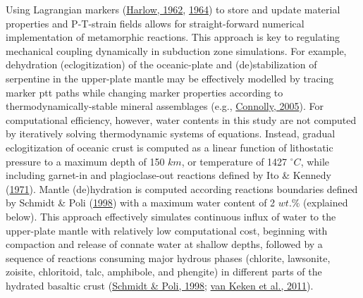 Using Lagrangian markers (\protect\hyperlink{ref-harlow1962}{Harlow, 1962}, \protect\hyperlink{ref-harlow1964}{1964}) to store and update material properties and P-T-strain fields allows for straight-forward numerical implementation of metamorphic reactions. This approach is key to regulating mechanical coupling dynamically in subduction zone simulations. For example, dehydration (eclogitization) of the oceanic-plate and (de)stabilization of serpentine in the upper-plate mantle may be effectively modelled by tracing marker \gls{ptt} paths while changing marker properties according to thermodynamically-stable mineral assemblages (e.g., \protect\hyperlink{ref-connolly2005}{Connolly, 2005}). For computational efficiency, however, water contents in this study are not computed by iteratively solving thermodynamic systems of equations. Instead, gradual eclogitization of oceanic crust is computed as a linear function of lithostatic pressure to a maximum depth of 150 \(km\), or temperature of 1427 \(^\circ C\), while including garnet-in and plagioclase-out reactions defined by Ito \& Kennedy (\protect\hyperlink{ref-ito1971}{1971}). Mantle (de)hydration is computed according reactions boundaries defined by Schmidt \& Poli (\protect\hyperlink{ref-schmidt1998}{1998}) with a maximum water content of 2 \(wt.\%\) (explained below). This approach effectively simulates continuous influx of water to the upper-plate mantle with relatively low computational cost, beginning with compaction and release of connate water at shallow depths, followed by a sequence of reactions consuming major hydrous phases (chlorite, lawsonite, zoisite, chloritoid, talc, amphibole, and phengite) in different parts of the hydrated basaltic crust (\protect\hyperlink{ref-schmidt1998}{Schmidt \& Poli, 1998}; \protect\hyperlink{ref-vankeken2011}{van Keken et al., 2011}).

